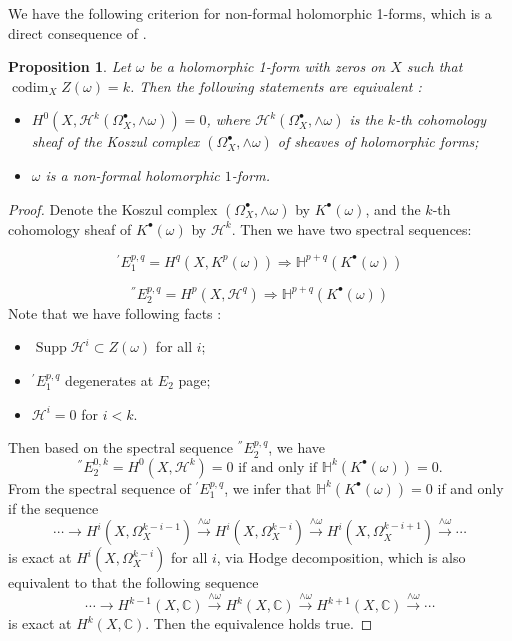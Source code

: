 \documentclass[a4paper,12pt,reqno]{amsart}
\newtheorem{proposition}[theorem]{Proposition}
\theoremstyle{question}
\theoremstyle{definition}
\theoremstyle{remark}
\theoremstyle{cited}
\theoremstyle{citeddef}
\def\CC{{\mathbb C}}
\def\HH{{\mathbb H}}
\def\cH{\mathcal{H}}
\DeclareMathOperator{\codim}{codim}
\DeclareMathOperator{\Supp}{Supp}
\begin{document}
We have the following criterion for non-formal holomorphic 1-forms, which is a direct consequence of \cite{GL87}.
\begin{proposition}\label{nonHodge}
Let $\omega$ be a holomorphic 1-form with zeros on $X$ such that $\codim_XZ(\omega)=k$. Then the following statements are equivalent :
    \begin{itemize}
        \item[(a)] $H^{0}(X,\cH^k(\Omega_X^{\bullet},\wedge\omega))=0$, where $\cH^k(\Omega_X^{\bullet},\wedge\omega)$ is the $k$-th cohomology sheaf of the Koszul complex $(\Omega_X^{\bullet},\wedge\omega)$ of sheaves of holomorphic forms;
        \item[(b)] $\omega$ is a non-formal holomorphic $1$-form.
    \end{itemize}
\end{proposition}
\begin{proof}
   Denote the Koszul complex $(\Omega_X^{\bullet},\wedge\omega) $  by $K^{\bullet}(\omega)$, and the $k$-th cohomology sheaf of $K^{\bullet}(\omega)$  by $\cH^k$. Then we have two  spectral sequences:

\[
^{'}E_{1}^{p,q} = H^{q}(X, K^{p}(\omega)) \Rightarrow \HH^{p+q}(K^{\bullet}(\omega))
\]

\[
^{''}E_{2}^{p,q} = H^{p}(X, \cH^{q}) \Rightarrow \HH^{p+q}(K^{\bullet}(\omega))
\]
Note that we have following facts \cite[Proposition~3.7 and Lemma~3.8]{GL87}:
\begin{itemize}
    \item $\Supp \cH^{i}\subset Z(\omega)$ for all $i$;
    \item $^{'}E_{1}^{p,q}$ degenerates at  $E_{2}$ page;
    \item $\cH^{i}= 0$ for $i < k$.
\end{itemize} 
Then based on the spectral sequence $^{''}E_{2}^{p,q}$, we have 
\[
^{''}E_{2}^{0,k}= H^{0}(X, \cH^{k})=0\text{ if and only if }   \HH^k(K^{\bullet}(\omega))=0.
\]
From the spectral sequence of $^{'}E_{1}^{p,q}$, we infer that
 $\HH^k(K^{\bullet}(\omega))=0$ if and only if the sequence
 \[
 \cdots\rightarrow H^i(X,\Omega_{X}^{k-i-1}) \xrightarrow{\wedge \omega} H^i(X,\Omega_{X}^{k-i}) \xrightarrow{\wedge \omega} H^i(X,\Omega_{X}^{k-i+1}) \xrightarrow{\wedge \omega} \cdots 
 \]
 is exact at $H^i(X,\Omega_{X}^{k-i})$ for all $i$, via Hodge decomposition, which is also equivalent to that the following sequence
 \[
 \cdots\rightarrow H^{k-1}(X,\CC) \xrightarrow{\wedge \omega} H^{k}(X,\CC) \xrightarrow{\wedge \omega} H^{k+1}(X,\CC)\xrightarrow{\wedge \omega} \cdots 
 \]
 is exact at $H^k(X,\CC)$. Then the equivalence holds true.
\end{proof}
\end{document}
